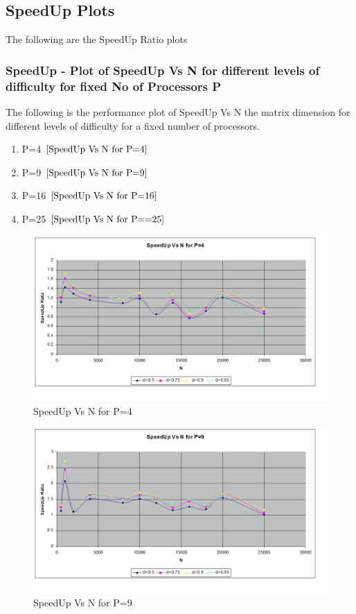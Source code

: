 \documentclass[twoside,11pt]{article}\usepackage{amsmath,amsfonts,amsthm,fullpage}
\begin{document}
\subsection{SpeedUp Plots}

The following are the SpeedUp Ratio plots

\pagebreak
\subsubsection{SpeedUp - Plot of SpeedUp Vs N for different levels of difficulty for fixed No of Processors P}
The following is the performance plot of SpeedUp Vs N the matrix dimension for different levels of difficulty for a fixed number of processors.

\begin{enumerate}
\item
P=4 $\eqref{SpeedUp Vs N for P=4}$
\item
P=9 $\eqref{SpeedUp Vs N for P=9}$
\item
P=16 $\eqref{SpeedUp Vs N for P=16}$
\item
P=25 $\eqref{SpeedUp Vs N for P==25}$
\end{enumerate}

\begin{figure}[!htbp]
\centering
\includegraphics[scale=.46]{charts/speedup_n_d_p_4} 
\caption{SpeedUp Vs N for P=4}
\label{SpeedUp Vs N for P=4}
\end{figure}

\begin{figure}[!htbp]
\centering
\includegraphics[scale=.46]{charts/speedup_n_d_p_9} 
\caption{SpeedUp Vs N for P=9}
\label{SpeedUp Vs N for P=9}
\end{figure}
\end{document}
